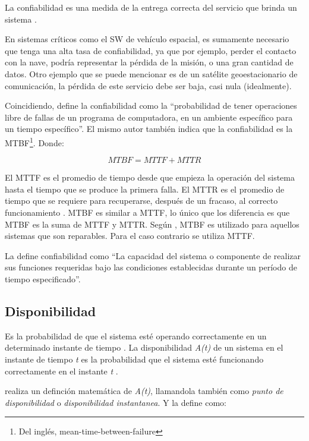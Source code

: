 La confiabilidad es una medida de la entrega correcta del servicio que brinda un sistema
\citep{FTDesign}.

En sistemas críticos como el \ac{SW} de vehículo espacial, es sumamente necesario que tenga una
alta tasa de confiabilidad, ya que por ejemplo, perder el contacto con la nave, podría representar
la pérdida de la misión, o una gran cantidad de datos. Otro ejemplo que se puede mencionar es de un
satélite geoestacionario de comunicación, la pérdida de este servicio debe ser baja, casi nula
(idealmente).

Coincidiendo, \cite{pressman01} define la confiabilidad como la ``probabilidad de tener operaciones
libre de fallas de un programa de computadora, en un ambiente específico para un tiempo
específico''. El mismo autor también indica que la confiabilidad es la \ac{MTBF}\footnote{Del
inglés, mean-time-between-failure}. Donde:

$$MTBF = MTTF + MTTR$$

El \ac{MTTF} es el promedio de tiempo desde que empieza la operación del sistema hasta el tiempo que
se produce la primera falla. El \ac{MTTR} es el promedio de tiempo que se requiere para recuperarse,
después de un fracaso, al correcto funcionamiento \citep{Hanmer07}. \ac{MTBF}  es similar a
\ac{MTTF}, lo único que los diferencia es que \ac{MTBF} es la suma de \ac{MTTF} y \ac{MTTR}. Según
\cite{Hanmer07}, \ac{MTBF} es utilizado para aquellos sistemas que son reparables. Para el caso
contrario se utiliza \ac{MTTF}.

La \cite{IEEE610.12} define confiabilidad como ``La capacidad del sistema o componente de realizar
sus funciones requeridas bajo las condiciones establecidas durante un período de tiempo
especificado''.

\subsection{Disponibilidad}\label{subsec:disponibilidad}
Es la probabilidad de que el sistema esté operando correctamente en un determinado instante de
tiempo \citep{SoftwareFaultToleranceATutorial}. La disponibilidad \textit{A(t)} de un sistema en el
instante de tiempo \textit{t} es la probabilidad que el sistema esté funcionando correctamente en
el instante \textit{t} \citep{FTDesign}.

\cite{FTDesign} realiza un definción matemática de \textit{A(t)}, llamandola también como
\textit{punto de disponibilidad} o \textit{disponibilidad instantanea}. Y la define como:

